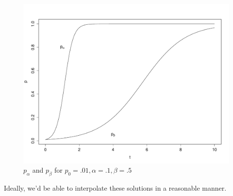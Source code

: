 \documentclass[11pt]{article}
\begin{document}
\begin{figure}
     \includegraphics[width=\textwidth]{solution-plot}
\caption{$p_\alpha$ and $p_\beta$ for $p_0 = .01, \alpha=.1, \beta=.5$}
\label{solution-plot}
\end{figure}

Ideally, we'd be able to interpolate these solutions in a reasonable manner. 

% 
% 
% 
\end{document}
